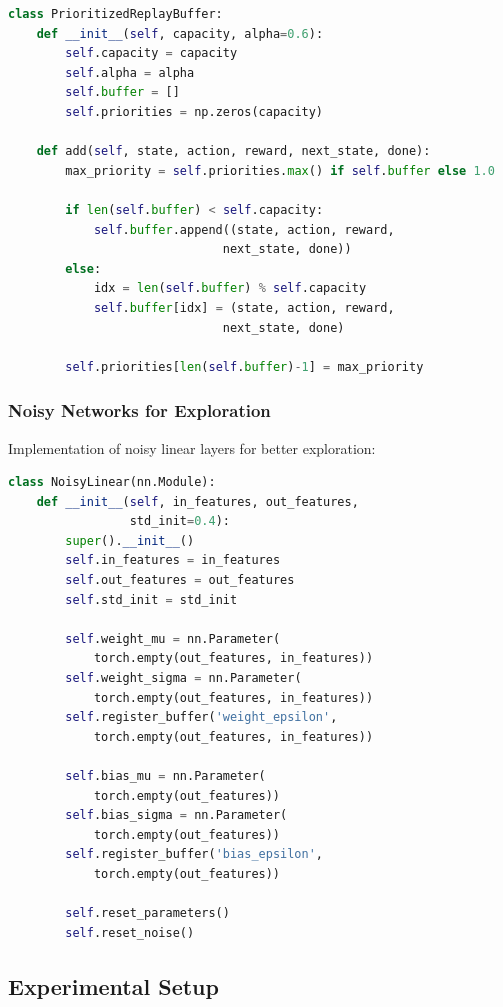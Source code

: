 \documentclass[conference]{IEEEtran}
\begin{document}
\begin{lstlisting}[language=Python]
class PrioritizedReplayBuffer:
    def __init__(self, capacity, alpha=0.6):
        self.capacity = capacity
        self.alpha = alpha
        self.buffer = []
        self.priorities = np.zeros(capacity)
        
    def add(self, state, action, reward, next_state, done):
        max_priority = self.priorities.max() if self.buffer else 1.0
        
        if len(self.buffer) < self.capacity:
            self.buffer.append((state, action, reward, 
                              next_state, done))
        else:
            idx = len(self.buffer) % self.capacity
            self.buffer[idx] = (state, action, reward, 
                              next_state, done)
            
        self.priorities[len(self.buffer)-1] = max_priority
\end{lstlisting}

\subsubsection{Noisy Networks for Exploration}
Implementation of noisy linear layers for better exploration:

\begin{lstlisting}[language=Python]
class NoisyLinear(nn.Module):
    def __init__(self, in_features, out_features, 
                 std_init=0.4):
        super().__init__()
        self.in_features = in_features
        self.out_features = out_features
        self.std_init = std_init
        
        self.weight_mu = nn.Parameter(
            torch.empty(out_features, in_features))
        self.weight_sigma = nn.Parameter(
            torch.empty(out_features, in_features))
        self.register_buffer('weight_epsilon', 
            torch.empty(out_features, in_features))
        
        self.bias_mu = nn.Parameter(
            torch.empty(out_features))
        self.bias_sigma = nn.Parameter(
            torch.empty(out_features))
        self.register_buffer('bias_epsilon', 
            torch.empty(out_features))
        
        self.reset_parameters()
        self.reset_noise()
\end{lstlisting}

\subsection{Experimental Setup}
\end{document}
